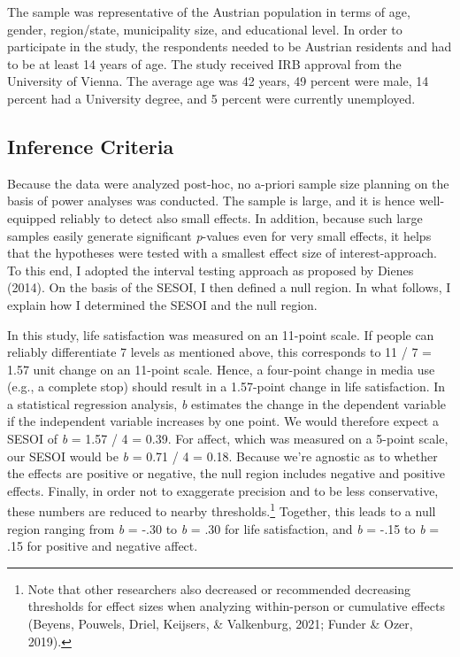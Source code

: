 \documentclass[
  english,
  man,mask,floatsintext]{apa6}
\begin{document}
The sample was representative of the Austrian population in terms of age, gender, region/state, municipality size, and educational level.
In order to participate in the study, the respondents needed to be Austrian residents and had to be at least 14 years of age.
The study received IRB approval from the University of Vienna.
The average age was 42 years, 49 percent were male, 14 percent had a University degree, and 5 percent were currently unemployed.

\hypertarget{inference-criteria}{%
\subsection{Inference Criteria}\label{inference-criteria}}

Because the data were analyzed post-hoc, no a-priori sample size planning on the basis of power analyses was conducted.
The sample is large, and it is hence well-equipped reliably to detect also small effects.
In addition, because such large samples easily generate significant \emph{p}-values even for very small effects, it helps that the hypotheses were tested with a smallest effect size of interest-approach.
To this end, I adopted the interval testing approach as proposed by Dienes (2014).
On the basis of the SESOI, I then defined a null region.
In what follows, I explain how I determined the SESOI and the null region.

In this study, life satisfaction was measured on an 11-point scale.
If people can reliably differentiate 7 levels as mentioned above, this corresponds to 11 / 7 = 1.57 unit change on an 11-point scale.
Hence, a four-point change in media use (e.g., a complete stop) should result in a 1.57-point change in life satisfaction.
In a statistical regression analysis, \emph{b} estimates the change in the dependent variable if the independent variable increases by one point.
We would therefore expect a SESOI of \emph{b} = 1.57 / 4 = 0.39.
For affect, which was measured on a 5-point scale, our SESOI would be \emph{b} = 0.71 / 4 = 0.18.
Because we're agnostic as to whether the effects are positive or negative, the null region includes negative and positive effects.
Finally, in order not to exaggerate precision and to be less conservative, these numbers are reduced to nearby thresholds.\footnote{Note that other researchers also decreased or recommended decreasing thresholds for effect sizes when analyzing within-person or cumulative effects (Beyens, Pouwels, Driel, Keijsers, \& Valkenburg, 2021; Funder \& Ozer, 2019).}
Together, this leads to a null region ranging from \emph{b} = -.30 to \emph{b} = .30 for life satisfaction, and \emph{b} = -.15 to \emph{b} = .15 for positive and negative affect.
\end{document}
